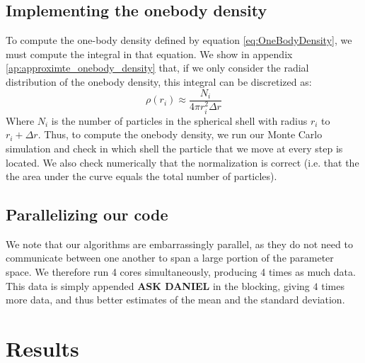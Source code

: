 \documentclass[a4paper, 10pt]{article}
\begin{document}
	\subsection{Implementing the onebody density}\label{sec:MetOneBody}
	To compute the one-body density defined by equation \ref{eq:OneBodyDensity}, we must compute the integral in that equation. We show in appendix \ref{ap:approximte_onebody_density} that, if we only consider the radial distribution of the onebody density, this integral can be discretized as:
	\begin{equation}
		\rho(r_i)\approx \frac{N_i}{4\pi r_i^2 \Delta r}
		\end{equation}
		Where $N_i$ is the number of particles in the spherical shell with radius $r_i$ to $r_i+\Delta r$. Thus, to compute the onebody density, we run our Monte Carlo simulation and check in which shell the particle that we move at every step is located. We also check numerically that the normalization is correct (i.e. that the the area under the curve equals the total number of particles).
	\subsection{Parallelizing our code}
	We note that our algorithms are embarrassingly parallel, as they do not need to communicate between one another to span a large portion of the parameter space. We therefore run 4 cores simultaneously, producing 4 times as much data. This data is simply appended \textbf{ASK DANIEL} in the blocking, giving $4$ times more data, and thus better estimates of the mean and the standard deviation.
	\section{Results}
\end{document}
